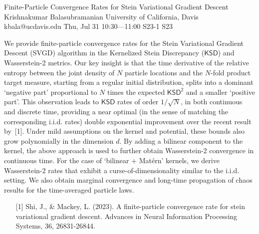 \begin{talk}
  {Finite-Particle Convergence Rates for Stein Variational Gradient Descent}%
  {Krishnakumar Balasubramanian}%
  {University of California, Davis}%
  {kbala@ucdavis.edu}%
  {}%
  {}%
  {Thu, Jul 31 10:30---11:00}%
  {S23-1}%
  {S23}%
  {}%
  
    
   
 We provide finite-particle convergence rates for the Stein Variational Gradient Descent (SVGD) algorithm in the Kernelized Stein Discrepancy ($\mathsf{KSD}$) and Wasserstein-2 metrics. Our key insight is that the time derivative of the relative entropy between the joint density of $N$ particle locations and the $N$-fold product target measure, starting from a regular initial distribution, splits into a dominant `negative part' proportional to $N$ times the expected $\mathsf{KSD}^2$ and a smaller `positive part'. This observation leads to $\mathsf{KSD}$ rates of order $1/\sqrt{N}$, in both continuous and discrete time, providing a near optimal (in the sense of matching the corresponding i.i.d. rates) double exponential improvement over the recent result by~[1]. Under mild assumptions on the kernel and potential, these bounds also grow polynomially in the dimension $d$. By adding a bilinear component to the kernel, the above approach is used to further obtain Wasserstein-2 convergence in continuous time. For the case of `bilinear + Mat\'ern' kernels, we derive Wasserstein-2 rates that exhibit a curse-of-dimensionality similar to the i.i.d. setting. We also obtain marginal convergence and long-time propagation of chaos results for the time-averaged particle laws. 

\medskip


\begin{enumerate}
 \item[{[1]}] Shi, J., \& Mackey, L. (2023). A finite-particle convergence rate for stein variational gradient descent. Advances in Neural Information Processing Systems, 36, 26831-26844.
\end{enumerate}

\end{talk}

